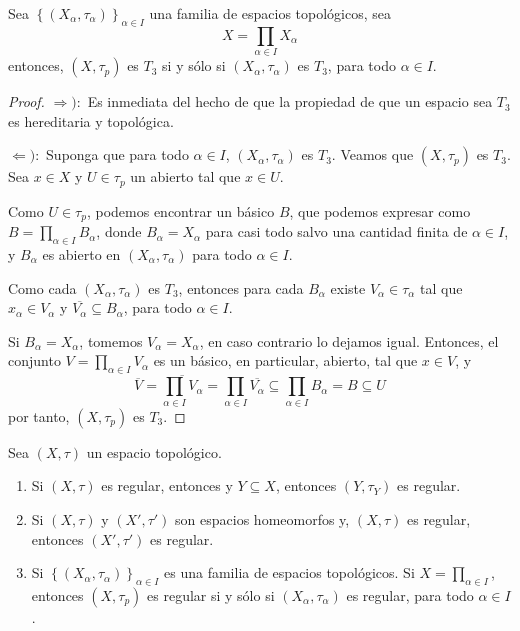 \documentclass[12pt]{report}
\theoremstyle{largebreak}
\newcommand{\Cls}[1]{\ensuremath{\overline{#1}}}
\begin{document}
    \begin{propo}
        Sea $\left\{(X_\alpha,\tau_\alpha) \right\}_{\alpha\in I}$ una familia de espacios topológicos, sea
        \begin{equation*}
            X=\prod_{\alpha\in I}X_\alpha
        \end{equation*}
        entonces, $(X,\tau_p)$ es $T_3$ si y sólo si $(X_\alpha,\tau_\alpha)$ es $T_3$, para todo $\alpha\in I$.
    \end{propo}

    \begin{proof}
        $\Rightarrow):$ Es inmediata del hecho de que la propiedad de que un espacio sea $T_3$ es hereditaria y topológica.

        $\Leftarrow):$ Suponga que para todo $\alpha\in I$, $(X_\alpha,\tau_\alpha)$ es $T_3$. Veamos que $(X,\tau_p)$ es $T_3$. Sea $x\in X$ y $U\in\tau_p$ un abierto tal que $x\in U$.

        Como $U\in\tau_p$, podemos encontrar un básico $B$, que podemos expresar como $B=\prod_{\alpha\in I}B_\alpha$, donde $B_\alpha=X_\alpha$ para casi todo salvo una cantidad finita de $\alpha\in I$, y $B_\alpha$ es abierto en $(X_\alpha,\tau_\alpha)$ para todo $\alpha\in I$.

        Como cada $(X_\alpha,\tau_\alpha)$ es $T_3$, entonces para cada $B_\alpha$ existe $V_\alpha\in\tau_\alpha$ tal que $x_\alpha\in V_\alpha$ y $\Cls{V_\alpha}\subseteq B_\alpha$, para todo $\alpha\in I$.

        Si $B_\alpha=X_\alpha$, tomemos $V_\alpha=X_\alpha$, en caso contrario lo dejamos igual. Entonces, el conjunto $V=\prod_{\alpha\in I}V_\alpha$ es un básico, en particular, abierto, tal que $x\in V$, y
        \begin{equation*}
            \Cls{V}=\Cls{\prod_{\alpha\in I}V_\alpha}=\prod_{\alpha\in I}\Cls{V_\alpha}\subseteq\prod_{\alpha\in I}B_\alpha=B\subseteq U
        \end{equation*}
        por tanto, $(X,\tau_p)$ es $T_3$.
    \end{proof}

    \begin{cor}
        Sea $(X,\tau)$ un espacio topológico.
        \begin{enumerate}
            \item Si $(X,\tau)$ es regular, entonces y $Y\subseteq X$, entonces $(Y,\tau_Y)$ es regular.
            \item Si $(X,\tau)$ y $(X',\tau')$ son espacios homeomorfos y, $(X,\tau)$ es regular, entonces $(X',\tau')$ es regular.
            \item Si $\left\{(X_\alpha,\tau_\alpha) \right\}_{\alpha\in I}$ es una familia de espacios topológicos. Si $X=\prod_{\alpha\in I}$, entonces $(X,\tau_p)$ es regular si y sólo si $(X_\alpha,\tau_\alpha)$ es regular, para todo $\alpha\in I$.
        \end{enumerate}
    \end{cor}
\end{document}

